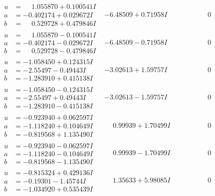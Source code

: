 \documentclass[1p]{elsarticle_modified}
\theoremstyle{definition}
\begin{document}
$$\begin{array}{c|c|c}
\begin{aligned}
u &= \phantom{-}1.055870 + 0.100541 I \\
a &= -0.402174 + 0.029672 I \\
b &= \phantom{-}0.529728 + 0.479846 I\end{aligned}
 & -6.48509 + 0.71958 I & \phantom{-0.000000 } 0 \\ \hline\begin{aligned}
u &= \phantom{-}1.055870 - 0.100541 I \\
a &= -0.402174 - 0.029672 I \\
b &= \phantom{-}0.529728 - 0.479846 I\end{aligned}
 & -6.48509 - 0.71958 I & \phantom{-0.000000 } 0 \\ \hline\begin{aligned}
u &= -1.058450 + 0.124315 I \\
a &= -2.55497 - 0.49443 I \\
b &= -1.283910 + 0.415138 I\end{aligned}
 & -3.02613 + 1.59757 I & \phantom{-0.000000 } 0 \\ \hline\begin{aligned}
u &= -1.058450 - 0.124315 I \\
a &= -2.55497 + 0.49443 I \\
b &= -1.283910 - 0.415138 I\end{aligned}
 & -3.02613 - 1.59757 I & \phantom{-0.000000 } 0 \\ \hline\begin{aligned}
u &= -0.923940 + 0.062597 I \\
a &= -1.118240 + 0.104649 I \\
b &= -0.819568 + 1.135490 I\end{aligned}
 & \phantom{-}0.99939 + 1.70499 I & \phantom{-0.000000 } 0 \\ \hline\begin{aligned}
u &= -0.923940 - 0.062597 I \\
a &= -1.118240 - 0.104649 I \\
b &= -0.819568 - 1.135490 I\end{aligned}
 & \phantom{-}0.99939 - 1.70499 I & \phantom{-0.000000 } 0 \\ \hline\begin{aligned}
u &= -0.815324 + 0.429136 I \\
a &= -0.19301 - 1.45744 I \\
b &= -1.034920 + 0.535439 I\end{aligned}
 & \phantom{-}1.35633 + 5.98085 I & \phantom{-0.000000 } 0 \\ \hline\begin{aligned}

\end{aligned}
\end{array}$$
\end{document}
